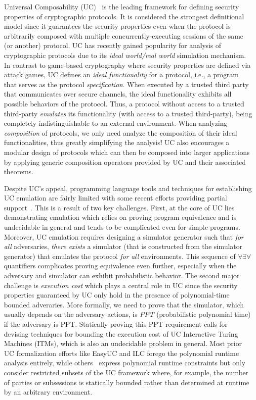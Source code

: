 Universal Composability (UC)~\cite{canettiUC} is the leading framework for defining security properties of cryptographic protocols.
It is considered the strongest definitional model since it guarantees the security properties even when the protocol is arbitrarily composed with
multiple concurrently-executing sessions of the same (or another) protocol.
UC has recently gained popularity for analysis of cryptographic protocols due to its \emph{ideal world/real world} simulation mechanism.
In contrast to game-based cryptography where security properties are defined via attack games,
UC defines an \emph{ideal functionality} for a protocol, i.e., a program that serves as the protocol \emph{specification}.
When executed by a trusted third party that communicates over secure channels, the ideal functionality exhibits all possible behaviors of the protocol.
Thus, a protocol without access to a trusted third-party \emph{emulates} its functionality (with access to a trusted third-party),
being completely indistinguishable to an external environment.
When analyzing \emph{composition} of protocols, we only need analyze the composition of their ideal functionalities, thus greatly
simplifying the analysis!
UC also encourages a modular design of protocols which can then be composed into larger applications by applying generic composition operators
provided by UC and their associated theorems.

Despite UC's appeal, programming language tools and techniques for establishing UC emulation are fairly limited with some recent efforts providing
partial support~\cite{ilc,easyuc,ipdl,symbolicuc,barbosa}. This is a result of two key challenges.
First, at the core of UC lies demonstrating emulation which relies on proving program equivalence and is undecidable in general
and tends to be complicated even for simple programs.
Moreover, UC emulation requires designing a simulator generator such that \emph{for all} adversaries, \emph{there exists} a simulator (that is constructed
from the simulator generator) that emulates the protocol \emph{for all} environments.
This sequence of $\forall \exists \forall$ quantifiers complicates proving equivalence even further, especially when the adversary and simulator can exhibit
probabilistic behavior.
The second major challenge is \emph{execution cost} which plays a central role in UC since the security properties
guaranteed by UC only hold in the presence of polynomial-time bounded adveraries.
More formally, we need to prove that the simulator, which usually depends on the adversary actions, is \emph{PPT} (probabilistic polynomial time)
if the adversary is PPT.
Statically proving this PPT requirement calls for devising techniques for bounding the execution cost of UC Interactive Turing Machines (ITMs),
which is also an undecidable problem in general.
Most prior UC formalization efforts like EasyUC and ILC forego the polynomial runtime analysis entirely, while others~\cite{ipdl,barbosa,ilc}
express polynomial runtime constraints but only consider restricted subsets of the UC framework where, for example, the number of parties
or subsessions is statically bounded rather than determined at runtime by an arbitrary environment.

